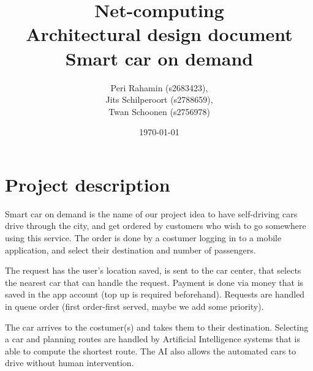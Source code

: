 \documentclass[a4paper]{article}
\begin{document}
\title{Net-computing\\
Architectural design document\\
Smart car on demand
}

\date{\today}

\author{Peri Rahamin (s2683423),\\
Jits Schilperoort (s2788659),\\
Twan Schoonen (s2756978)
}




\maketitle
\section*{Project description}
Smart car on demand is the name of our project idea to have self-driving cars drive through the city, and get ordered by customers who wish to go somewhere using this service. The order is done by a costumer logging in to a mobile application, and select their destination and number of passengers.

The request has the user's location saved, is sent to the car center, that selects the nearest car that can handle the request. Payment is done via money that is saved in the app account (top up is required beforehand). Requests are handled in queue order (first order-first served, maybe we add some priority).

The car arrives to the costumer(s) and takes them to their destination. Selecting a car and planning routes are handled by Artificial Intelligence systems that is able to compute the shortest route. The AI also allows the automated cars to drive without human intervention.
\end{document}
